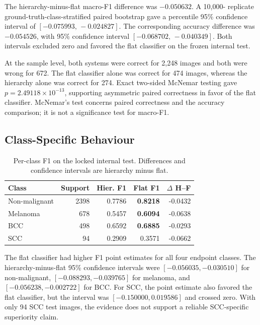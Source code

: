 The hierarchy-minus-flat macro-F1 difference was $-0.050632$. A 10,000-
replicate ground-truth-class-stratified paired bootstrap gave a percentile
95\% confidence interval of $[-0.075993,\,-0.024827]$. The corresponding
accuracy difference was $-0.054526$, with 95\% confidence interval
$[-0.068702,\,-0.040349]$. Both intervals excluded zero and favored the flat
classifier on the frozen internal test.

At the sample level, both systems were correct for 2,248 images and both were
wrong for 672. The flat classifier alone was correct for 474 images, whereas
the hierarchy alone was correct for 274. Exact two-sided McNemar testing gave
$p=2.49118\times10^{-13}$, supporting asymmetric paired correctness in favor
of the flat classifier. McNemar's test concerns paired correctness and the
accuracy comparison; it is not a significance test for macro-F1.

\subsection{Class-Specific Behaviour}

\begin{table}[t]
    \centering
    \caption{Per-class F1 on the locked internal test. Differences and
    confidence intervals are hierarchy minus flat.}
    \label{tab:per_class_comparison}
    \footnotesize
    \setlength{\tabcolsep}{2.8pt}
    \begin{tabular}{lrrrr}
        \toprule
        Class & Support & Hier. F1 & Flat F1 & $\Delta$ H--F \\
        \midrule
        Non-malignant & 2398 & 0.7786 & \textbf{0.8218} & -0.0432 \\
        Melanoma      &  678 & 0.5457 & \textbf{0.6094} & -0.0638 \\
        BCC           &  498 & 0.6592 & \textbf{0.6885} & -0.0293 \\
        SCC           &   94 & 0.2909 & 0.3571 & -0.0662 \\
        \bottomrule
    \end{tabular}
\end{table}

The flat classifier had higher F1 point estimates for all four endpoint
classes. The hierarchy-minus-flat 95\% confidence intervals were
$[-0.056035,-0.030510]$ for non-malignant, $[-0.088293,-0.039765]$ for
melanoma, and $[-0.056238,-0.002722]$ for BCC. For SCC, the point estimate
also favored the flat classifier, but the interval was
$[-0.150000,0.019586]$ and crossed zero. With only 94 SCC test images, the
evidence does not support a reliable SCC-specific superiority claim.

